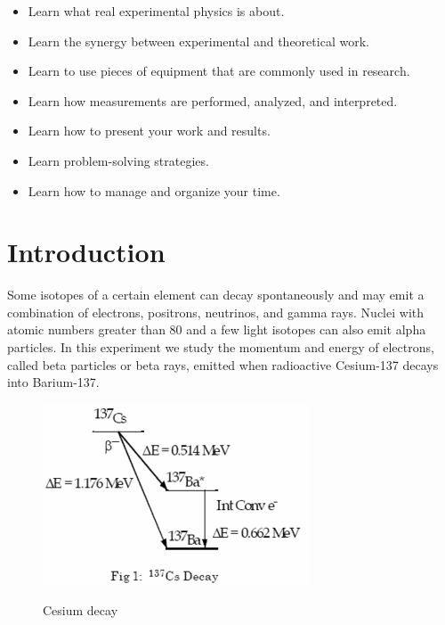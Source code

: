 \documentclass{../lab}
\begin{document}
\begin{itemize}
    \item Learn what real experimental physics is about.

    \item Learn the synergy between experimental and theoretical work.

    \item Learn to use pieces of equipment that are commonly used in research.

    \item Learn how measurements are performed, analyzed, and interpreted.

    \item Learn how to present your work and results.

    \item Learn problem-solving strategies.

    \item Learn how to manage and organize your time.
\end{itemize}

\section{Introduction}

Some isotopes of a certain element can decay spontaneously and may emit a combination of electrons, positrons, neutrinos, and gamma rays. Nuclei with atomic numbers greater than 80 and a few light isotopes can also emit alpha particles. In this experiment we study the momentum and energy of electrons, called beta particles or beta rays, emitted when radioactive Cesium-137 decays into Barium-137.

\begin{figure}[h]
    \centering
    \href{http://experimentationlab.berkeley.edu/sites/default/files/images/300px-BRAimage003.gif}{\includegraphics[width=0.5\linewidth]{images/300px-BRAimage003.png}}
    \caption{Cesium decay}
    \label{fig:300px-BRAimage003}
\end{figure}
\end{document}
